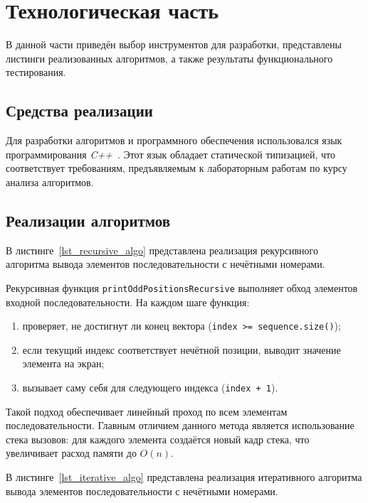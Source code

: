 \chapter{Технологическая часть}

В данной части приведён выбор инструментов для разработки, представлены листинги реализованных алгоритмов, а также результаты функционального тестирования.

\section{Средства реализации}

Для разработки алгоритмов и программного обеспечения использовался язык программирования \textit{C++}~\cite{cpp}. 
Этот язык обладает статической типизацией, что соответствует требованиям, предъявляемым к лабораторным работам по курсу анализа алгоритмов.

\section{Реализации алгоритмов}

В листинге~\ref{lst_recursive_algo} представлена реализация рекурсивного алгоритма
вывода элементов последовательности с нечётными номерами.



Рекурсивная функция \texttt{printOddPositionsRecursive} выполняет обход элементов входной последовательности.
На каждом шаге функция:
\begin{enumerate}
	\item проверяет, не достигнут ли конец вектора (\texttt{index >= sequence.size()});
	\item если текущий индекс соответствует нечётной позиции, выводит значение элемента на экран;
	\item вызывает саму себя для следующего индекса (\texttt{index + 1}).
\end{enumerate}

Такой подход обеспечивает линейный проход по всем элементам последовательности.  
Главным отличием данного метода является использование стека вызовов: для каждого элемента создаётся новый кадр стека, что увеличивает расход памяти до $O(n)$.

В листинге~\ref{lst_iterative_algo} представлена реализация итеративного алгоритма
вывода элементов последовательности с нечётными номерами.
\clearpage

